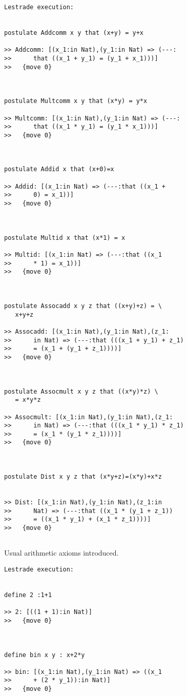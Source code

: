 \documentclass{article}
\begin{document}
\begin{verbatim}Lestrade execution:


postulate Addcomm x y that (x+y) = y+x

>> Addcomm: [(x_1:in Nat),(y_1:in Nat) => (---:
>>      that ((x_1 + y_1) = (y_1 + x_1)))]
>>   {move 0}



postulate Multcomm x y that (x*y) = y*x

>> Multcomm: [(x_1:in Nat),(y_1:in Nat) => (---:
>>      that ((x_1 * y_1) = (y_1 * x_1)))]
>>   {move 0}



postulate Addid x that (x+0)=x

>> Addid: [(x_1:in Nat) => (---:that ((x_1 +
>>      0) = x_1))]
>>   {move 0}



postulate Multid x that (x*1) = x

>> Multid: [(x_1:in Nat) => (---:that ((x_1
>>      * 1) = x_1))]
>>   {move 0}



postulate Assocadd x y z that ((x+y)+z) = \
   x+y+z

>> Assocadd: [(x_1:in Nat),(y_1:in Nat),(z_1:
>>      in Nat) => (---:that (((x_1 + y_1) + z_1)
>>      = (x_1 + (y_1 + z_1))))]
>>   {move 0}



postulate Assocmult x y z that ((x*y)*z) \
   = x*y*z

>> Assocmult: [(x_1:in Nat),(y_1:in Nat),(z_1:
>>      in Nat) => (---:that (((x_1 * y_1) * z_1)
>>      = (x_1 * (y_1 * z_1))))]
>>   {move 0}



postulate Dist x y z that (x*y+z)=(x*y)+x*z


>> Dist: [(x_1:in Nat),(y_1:in Nat),(z_1:in
>>      Nat) => (---:that ((x_1 * (y_1 + z_1))
>>      = ((x_1 * y_1) + (x_1 * z_1))))]
>>   {move 0}


\end{verbatim}

Usual arithmetic axioms introduced.

\begin{verbatim}Lestrade execution:


define 2 :1+1

>> 2: [((1 + 1):in Nat)]
>>   {move 0}



define bin x y : x+2*y

>> bin: [(x_1:in Nat),(y_1:in Nat) => ((x_1
>>      + (2 * y_1)):in Nat)]
>>   {move 0}


\end{verbatim}
\end{document}
